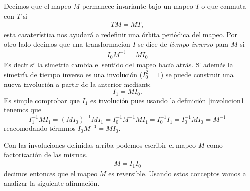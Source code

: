Decimos que el mapeo $M$ permanece invariante bajo un mapeo $T$ o que conmuta con $T$ si 
\begin{eqnarray}
TM = MT,
\label{conmuta}
\end{eqnarray}
esta carater\'istica nos ayudar\'a a redefinir una \'orbita peri\'odica del mapeo. Por otro lado decimos que una transformaci\'on $I$ se dice de \textit{tiempo inverso} para $M$ si 
\begin{eqnarray}
I_{0}M^{-1} = MI_{0}
\label{involucion1}
\end{eqnarray}
Es decir si la simetr\'ia cambia el sentido del mapeo hac\'ia atr\'as. Si adem\'as la simetr\'ia de tiempo inverso es una involuci\'on ($I_{0}^{2}=1$) se puede construir una nueva involuci\'on a partir de la anterior mediante 
\begin{equation}
I_{1} = MI_{0}.
\label{involucion2}
\end{equation}
Es simple comprobar que $I_{1}$ es involuci\'on pues usando la definici\'on \ref{involucion1} tenemos que 
\begin{equation*}
I_{1}^{-1}MI_{1} = (MI_{0})^{-1}MI_{1} = I_{0}^{-1}M^{-1}MI_{1} = I_{0}^{-1}I_{1} = I^{-1}_{0}MI_{0}=M^{-1}
\end{equation*}
reacomodando t\'erminos $I_{0}M^{-1}= MI_{0}$.
 
Con las involuciones definidas arriba podemos escribir el mapeo $M$ como factorizaci\'on de las mismas.
\begin{eqnarray}
M = I_{1}I_{0}
\end{eqnarray}
decimos entonces que el mapeo $M$ es reversible. Usando estos conceptos vamos a analizar la siguiente afirmaci\'on. \\

